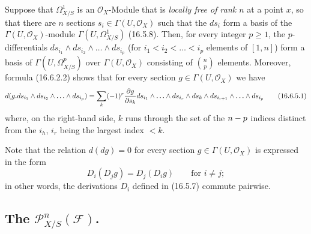 \begin{env}[16.6.5]
\label{IV.16.6.5}
Suppose that $\varOmega_{X/S}^1$ is an $\mathcal{O}_X$-Module that is \emph{locally free
of rank $n$} at a point $x$, so that there are $n$ sections
$s_i\in\Gamma(U,\mathcal{O}_X)$ such that the $ds_i$ form a basis of the
$\Gamma(U,\mathcal{O}_X)$-module $\Gamma(U,\varOmega_{X/S}^1)$ (16.5.8).
Then, for every integer $p\geq1$, the $p$-differentials
$ds_{i_1}\wedge ds_{i_2}\wedge\ldots\wedge ds_{i_p}$ (for
$i_1<i_2<\ldots<i_p$ elements of $[1,n]$) form a basis of
$\Gamma(U,\varOmega_{X/S}^p)$ over $\Gamma(U,\mathcal{O}_X)$ consisting of
$\binom{n}{p}$ elements. Moreover, formula (16.6.2.2) shows that for
every section $g\in\Gamma(U,\mathcal{O}_X)$ we have
\[
  d(g.ds_{i_1}\wedge ds_{i_2}\wedge\ldots\wedge ds_{i_p})
  =\sum_k(- 1)^r\frac{\partial g}{\partial s_k}
  ds_{i_1}\wedge\ldots\wedge ds_{i_r}\wedge ds_k\wedge
  ds_{i_{r+1}}\wedge\ldots\wedge ds_{i_p}
  \tag{16.6.5.1}
  \label{IV.16.6.5.1}
\]
where, on the right-hand side, $k$ runs through the set of the $n- p$ indices
distinct from the $i_h$, $i_r$ being the largest index $<k$.

Note that the relation $d(dg)=0$ for every section
$g\in\Gamma(U,\mathcal{O}_X)$ is expressed in the form
\[
  D_i(D_jg)=D_j(D_ig)\qquad\text{for $i\neq j$};
\]
in other words, the derivations $D_i$ defined in (16.5.7) commute
pairwise.
\end{env}


\subsection{\texorpdfstring{The $\mathscr{P}_{X/S}^n(\mathscr{F})$.}{The P\string_\string^n(F).}}

